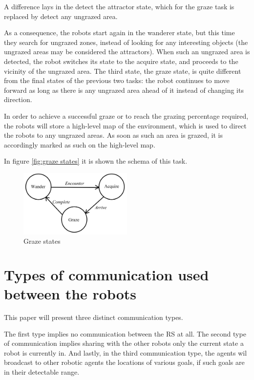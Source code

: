\documentclass[12pt]{report}
\begin{document}
A difference lays in the detect the attractor state, which for the graze task  is replaced by detect any ungrazed area.

As a consequence, the robots start again in the wanderer state, but this time they search for ungrazed zones, instead of looking for any interesting  objects (the ungrazed areas may be considered the attractors). When such an ungrazed area is detected, the robot switches its state to the acquire state, and proceeds to the vicinity of the ungrazed area. The third state, the graze state, is quite different from the final states of the previous two tasks: the robot continues to move forward as long as there is any ungrazed area ahead of it instead of changing its direction.

In order to achieve a successful graze or to reach the grazing percentage required, the robots will store a high-level map of the environment, which is used to direct the robots to any ungrazed areas. As soon as such an area is grazed, it is accordingly marked as such on the high-level map.


In figure \autoref{fig:graze states} it is shown the schema of this task.

\begin{figure}[h!]
\centering
\includegraphics[width=0.5\textwidth]{"6 graze states"}
\caption{Graze states}
\label{fig:graze states}
\end{figure}






\chapter{Types of communication used between the robots}


This paper will present three distinct communication types.

The first type implies no communication between the RS at all. The second type of communication implies sharing with the other robots only the current state a robot is currently in. And lastly, in the third communication type, the agents wil broadcast to other robotic agents the locations of various goals, if such goals are in their detectable range.
\end{document}
